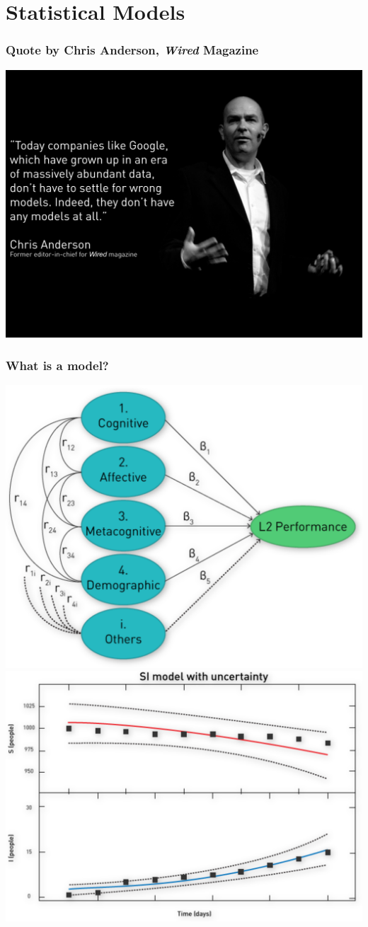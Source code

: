 \documentclass[12pt, block=fill]{beamer}
\begin{document}
\section{Statistical Models}

\begin{frame}
  \frametitle{Quote by Chris Anderson, \textit{Wired} Magazine}
  \includegraphics[width=1.0\linewidth]{figures/chris_anderson_quote.png}
\end{frame}

\begin{frame}
  \frametitle{What is a model?}
  \begin{center}
    \includegraphics[width=0.5\linewidth]{figures/model_a.png}
    \includegraphics[width=0.5\linewidth]{figures/model_b.png}     
  \end{center}
\end{frame}
\end{document}
